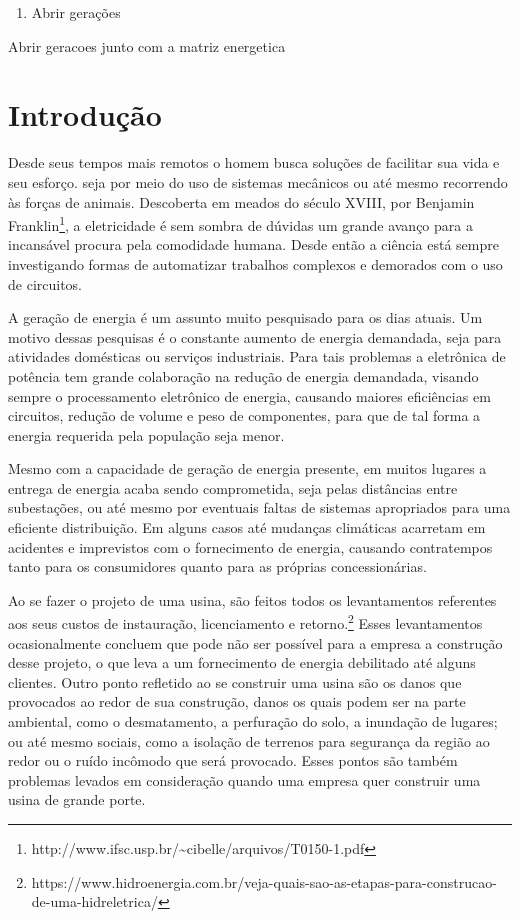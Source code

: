 \documentclass[
]{article}
\date{}
\providecommand{\tightlist}{%
  \setlength{\itemsep}{0pt}\setlength{\parskip}{0pt}}
\begin{document}
\begin{enumerate}
\def\labelenumi{\arabic{enumi}.}
\setcounter{enumi}{2}
\tightlist
\item
  Abrir gerações
\end{enumerate}

Abrir geracoes junto com a matriz energetica

\hypertarget{introduuxe7uxe3o}{%
\section{Introdução}\label{introduuxe7uxe3o}}

Desde seus tempos mais remotos o homem busca soluções de facilitar sua
vida e seu esforço. seja por meio do uso de sistemas mecânicos ou até
mesmo recorrendo às forças de animais. Descoberta em meados do século
XVIII, por Benjamin Franklin\footnote{http://www.ifsc.usp.br/\textasciitilde cibelle/arquivos/T0150-1.pdf},
a eletricidade é sem sombra de dúvidas um grande avanço para a
incansável procura pela comodidade humana. Desde então a ciência está
sempre investigando formas de automatizar trabalhos complexos e
demorados com o uso de circuitos.

A geração de energia é um assunto muito pesquisado para os dias atuais.
Um motivo dessas pesquisas é o constante aumento de energia demandada,
seja para atividades domésticas ou serviços industriais. Para tais
problemas a eletrônica de potência tem grande colaboração na redução de
energia demandada, visando sempre o processamento eletrônico de energia,
causando maiores eficiências em circuitos, redução de volume e peso de
componentes, para que de tal forma a energia requerida pela população
seja menor.

Mesmo com a capacidade de geração de energia presente, em muitos lugares
a entrega de energia acaba sendo comprometida, seja pelas distâncias
entre subestações, ou até mesmo por eventuais faltas de sistemas
apropriados para uma eficiente distribuição. Em alguns casos até
mudanças climáticas acarretam em acidentes e imprevistos com o
fornecimento de energia, causando contratempos tanto para os
consumidores quanto para as próprias concessionárias.

Ao se fazer o projeto de uma usina, são feitos todos os levantamentos
referentes aos seus custos de instauração, licenciamento e
retorno.\footnote{https://www.hidroenergia.com.br/veja-quais-sao-as-etapas-para-construcao-de-uma-hidreletrica/}
Esses levantamentos ocasionalmente concluem que pode não ser possível
para a empresa a construção desse projeto, o que leva a um fornecimento
de energia debilitado até alguns clientes. Outro ponto refletido ao se
construir uma usina são os danos que provocados ao redor de sua
construção, danos os quais podem ser na parte ambiental, como o
desmatamento, a perfuração do solo, a inundação de lugares; ou até mesmo
sociais, como a isolação de terrenos para segurança da região ao redor
ou o ruído incômodo que será provocado. Esses pontos são também
problemas levados em consideração quando uma empresa quer construir uma
usina de grande porte.
\end{document}

